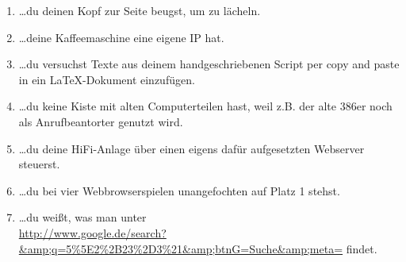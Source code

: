\begin{enumerate}
\item \ldots du deinen Kopf zur Seite beugst, um zu lächeln.
\item \ldots deine Kaffeemaschine eine eigene IP hat.
\item \ldots du versuchst Texte aus deinem handgeschriebenen Script per copy and paste in ein \LaTeX-Dokument einzufügen.
\item \ldots du keine Kiste mit alten Computerteilen hast, weil z.B. der alte 386er noch als Anrufbeantorter genutzt wird.
\item \ldots du deine HiFi-Anlage über einen eigens dafür aufgesetzten Webserver steuerst.
\item \ldots du bei vier Webbrowserspielen unangefochten auf Platz 1 stehst.
\item \ldots du weißt, was man unter\\ \url{http://www.google.de/search?&amp;q=5\%5E2\%2B23\%2D3\%21&amp;btnG=Suche&amp;meta=} findet.
\end{enumerate}
